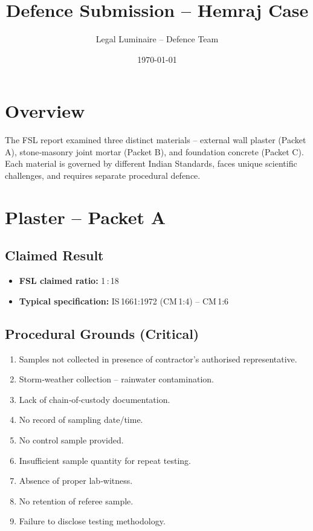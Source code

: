 \documentclass[12pt]{article}
\title{Defence Submission – Hemraj Case}
\author{Legal Luminaire – Defence Team}
\date{\today}
\begin{document}
\maketitle

\section*{Overview}
The FSL report examined three distinct materials – external wall plaster (Packet A), stone‑masonry joint mortar (Packet B), and foundation concrete (Packet C). Each material is governed by different Indian Standards, faces unique scientific challenges, and requires separate procedural defence.

\section*{Plaster – Packet A}
\subsection*{Claimed Result}
\begin{itemize}[nosep]
  \item \textbf{FSL claimed ratio:} 1 : 18
  \item \textbf{Typical specification:} IS 1661:1972 (CM 1:4) – CM 1:6
\end{itemize}

\subsection*{Procedural Grounds (Critical)}
\begin{enumerate}
  \item Samples not collected in presence of contractor’s authorised representative.
  \item Storm‑weather collection – rainwater contamination.
  \item Lack of chain‑of‑custody documentation.
  \item No record of sampling date/time.
  \item No control sample provided.
  \item Insufficient sample quantity for repeat testing.
  \item Absence of proper lab‑witness.
  \item No retention of referee sample.
  \item Failure to disclose testing methodology.
\end{enumerate}
\end{document}
